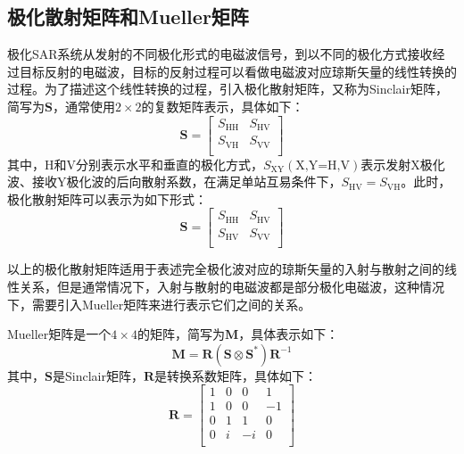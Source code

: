 \subsection{极化散射矩阵和Mueller矩阵}
极化SAR系统从发射的不同极化形式的电磁波信号，到以不同的极化方式接收经过目标反射的电磁波，目标的反射过程可以看做电磁波对应琼斯矢量的线性转换的过程。为了描述这个线性转换的过程，引入极化散射矩阵，又称为Sinclair矩阵，简写为$\textbf{S}$，通常使用$2\times2$的复数矩阵表示，具体如下：
\begin{equation}
    \textbf{S}  =\left[ \begin{matrix}
            S_{\mathrm{HH}} & S_{\mathrm{HV}} \\
            S_{\mathrm{VH}} & S_{\mathrm{VV}} \\
        \end{matrix} \right]
\end{equation}
其中，$\mathrm{H}$和$\mathrm{V}$分别表示水平和垂直的极化方式，$S_{\text{XY}}(\text{X,Y=H,V})$表示发射$\text{X}$极化波、接收$\text{Y}$极化波的后向散射系数，在满足单站互易条件下，$S_{\mathrm{HV}}=S_{\mathrm{VH}}$。此时，极化散射矩阵可以表示为如下形式：
\begin{equation}
    \textbf{S}  =\left[ \begin{matrix}
            S_{\mathrm{HH}} & S_{\mathrm{HV}} \\
            S_{\mathrm{HV}} & S_{\mathrm{VV}} \\
        \end{matrix} \right]
\end{equation}

以上的极化散射矩阵适用于表述完全极化波对应的琼斯矢量的入射与散射之间的线性关系，但是通常情况下，入射与散射的电磁波都是部分极化电磁波，这种情况下，需要引入Mueller矩阵来进行表示它们之间的关系。

Mueller矩阵是一个$4\times4$的矩阵，简写为$\textbf{M}$，具体表示如下：
\begin{equation}
    \label{Mueller}
    \textbf{M}=\textbf{R}\left( \textbf{S}\otimes \textbf{S}^* \right) \textbf{R}^{-1}
\end{equation}
其中，$\textbf{S}$是Sinclair矩阵，$\textbf{R}$是转换系数矩阵，具体如下：
\begin{equation}
    \label{R}
    \textbf{R}=\left[ \begin{matrix}
            1 & 0 & 0  & 1  \\
            1 & 0 & 0  & -1 \\
            0 & 1 & 1  & 0  \\
            0 & i & -i & 0  \\
        \end{matrix} \right]
\end{equation}

